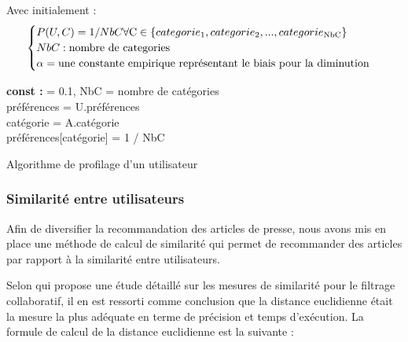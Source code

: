         Avec initialement :\\
        \[
        \begin{cases}
            P(U, C) = 1 / NbC \forall \text{C} \in \{categorie\textsubscript{1}, categorie\textsubscript{2}, ..., categorie\textsubscript{NbC}\}\\
            NbC : \text{nombre de categories}\\
            \alpha = \text{une constante empirique représentant le biais pour la diminution}
        \end{cases}
        \]
        \begin{algorithm2e}[H]
        \SetAlgoLined
        \textbf{const :} \alpha = 0.1, NbC = nombre de catégories\\
        préférences = U.préférences\\
        catégorie = A.catégorie\\
        {
            préférences[catégorie] = 1 / NbC
        }
        \caption{Algorithme de profilage d'un utilisateur}
        \end{algorithm2e}
        \subsubsection{Similarité entre utilisateurs}
        Afin de diversifier la recommandation des articles de presse, nous avons mis en place une méthode de calcul de similarité qui permet de recommander des articles par rapport à la similarité entre utilisateurs. 

        Selon \cite{euclidepreuve} qui propose une étude détaillé sur les mesures de similarité pour le filtrage collaboratif, il en est ressorti comme conclusion que la distance euclidienne était la mesure la plus adéquate en terme de précision et temps d'exécution. La formule de calcul de la distance euclidienne est la suivante :

